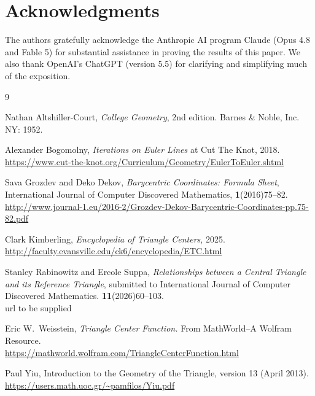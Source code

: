\documentclass[12pt,a4paper]{amsart}
\theoremstyle{remark}
\begin{document}
\section*{Acknowledgments}

The authors gratefully acknowledge the Anthropic AI program Claude (Opus 4.8 and Fable 5) for substantial assistance
in proving the results of this paper.
We also thank OpenAI's ChatGPT (version 5.5) for clarifying and simplifying much of the exposition.


\begin{thebibliography}{9}

\newcommand{\blue}{\color{blue}}
\newcommand{\black}{\color{black}}

{}
Nathan Altshiller-Court,
\textit{College Geometry},
2nd edition.
Barnes \& Noble, Inc. NY: 1952.

Alexander Bogomolny, \textit{Iterations on Euler Lines} at Cut The Knot, 2018.\\
\blue\url{https://www.cut-the-knot.org/Curriculum/Geometry/EulerToEuler.shtml}\black

Sava Grozdev and Deko Dekov, \textit{Barycentric Coordinates: Formula Sheet},
International Journal of Computer Discovered Mathematics, \textbf{1}(2016)75--82.\\
\blue\url{http://www.journal-1.eu/2016-2/Grozdev-Dekov-Barycentric-Coordinates-pp.75-82.pdf}\black

Clark Kimberling,
\textit{Encyclopedia of Triangle Centers}, 2025.\\
\blue\url{http://faculty.evansville.edu/ck6/encyclopedia/ETC.html}\black

Stanley Rabinowitz and Ercole Suppa, \textit{Relationships between a Central Triangle and its Reference Triangle},
submitted to International Journal of  Computer Discovered Mathematics. \textbf{11}(2026)60--103.\\
{\blue url to be supplied\black}

Eric W.~Weisstein, \emph{Triangle Center Function.} From MathWorld--A Wolfram Resource.\\
\blue\url{https://mathworld.wolfram.com/TriangleCenterFunction.html}\black

Paul Yiu, Introduction to the Geometry of the Triangle, version 13 (April 2013).\\
\blue\url{https://users.math.uoc.gr/~pamfilos/Yiu.pdf}\black


\end{thebibliography}

\end{document}
